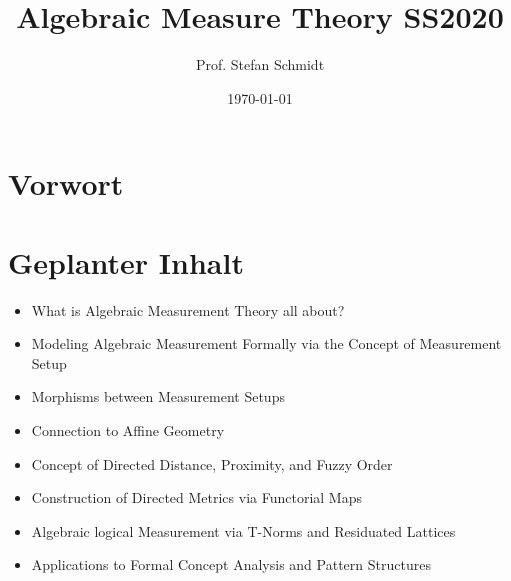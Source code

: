 \documentclass{article}
\title{Algebraic Measure Theory SS2020}
\author{Prof. Stefan Schmidt}
\date{\today}
\begin{document}
\maketitle
\setlength\parindent{0pt}
\section*{Vorwort}

\section*{Geplanter Inhalt}
\begin{itemize}
    \item What is Algebraic Measurement Theory all about?
    \item Modeling Algebraic Measurement Formally via the Concept of Measurement Setup
    \item Morphisms between Measurement Setups
    \item Connection to Affine Geometry
    \item Concept of Directed Distance, Proximity, and Fuzzy Order
    \item Construction of Directed Metrics via Functorial Maps
    \item Algebraic logical Measurement via T-Norms and Residuated Lattices
    \item Applications to Formal Concept Analysis and Pattern Structures
\end{itemize}




\end{document}
